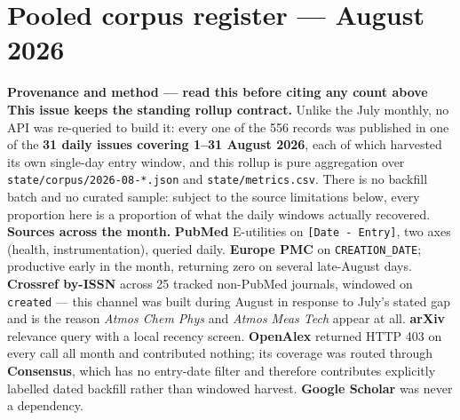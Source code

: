 \documentclass[10pt]{article}
\begin{document}
\vspace{3mm}



\clearpage

\section*{\sffamily\bfseries\color{Deep}Pooled corpus register --- August 2026}
\vspace{-1.5mm}{\color{Coral}\rule{\linewidth}{1.1pt}}\vspace{2.5mm}



\vspace{4mm}
\begin{keybox}
{\sffamily\bfseries\footnotesize\color{Deep}Provenance and method --- read this before
citing any count above}\\[1.2mm]
{\fontsize{7.2}{8.8}\selectfont
\textbf{This issue keeps the standing rollup contract.} Unlike the July monthly, no API
was re-queried to build it: every one of the 556 records was published in one of the
\textbf{31 daily issues covering 1--31 August 2026}, each of which harvested its own
single-day entry window, and this rollup is pure aggregation over
\texttt{state/corpus/2026-08-*.json} and \texttt{state/metrics.csv}. There is no
backfill batch and no curated sample: subject to the source limitations below, every
proportion here is a proportion of what the daily windows actually recovered.
\\[1.0mm]
\textbf{Sources across the month.} \textbf{PubMed} E-utilities on \texttt{[Date - Entry]},
two axes (health, instrumentation), queried daily. \textbf{Europe PMC} on
\texttt{CREATION\_DATE}; productive early in the month, returning zero on several late-August
days. \textbf{Crossref by-ISSN} across 25 tracked non-PubMed journals, windowed on
\texttt{created} --- this channel was built during August in response to July's stated gap
and is the reason \textit{Atmos Chem Phys} and \textit{Atmos Meas Tech} appear at all.
\textbf{arXiv} relevance query with a local recency screen. \textbf{OpenAlex} returned
HTTP 403 on every call all month and contributed nothing; its coverage was routed through
\textbf{Consensus}, which has no entry-date filter and therefore contributes explicitly
labelled dated backfill rather than windowed harvest. \textbf{Google Scholar} was never a
dependency.
\\[1.0mm]
}
\end{keybox}
\end{document}
